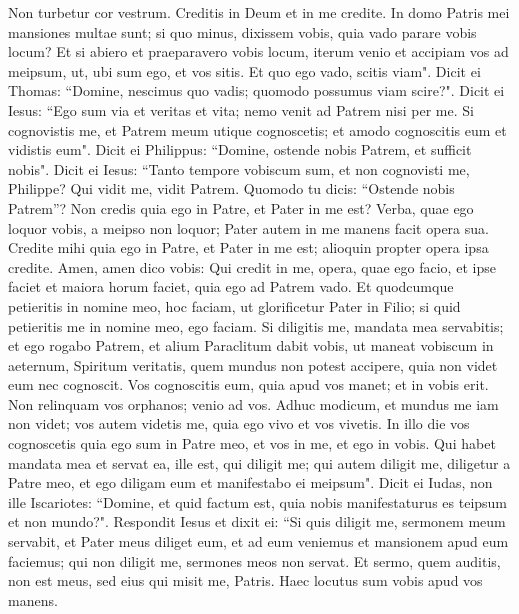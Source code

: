 \begin{biblechapter} 
\verse Non turbetur cor vestrum. Creditis in Deum et in me credite. 
\verse In domo Patris mei mansiones multae sunt; si quo minus, dixissem vobis, quia vado parare vobis locum? 
\verse Et si abiero et praeparavero vobis locum, iterum venio et accipiam vos ad meipsum, ut, ubi sum ego, et vos sitis. 
\verse Et quo ego vado, scitis viam". 
\verse Dicit ei Thomas: “Domine, nescimus quo vadis; quomodo possumus viam scire?".  
\verse Dicit ei Iesus: “Ego sum via et veritas et vita; nemo venit ad Patrem nisi per me. 
\verse Si cognovistis me, et Patrem meum utique cognoscetis; et amodo cognoscitis eum et vidistis eum". 
\verse Dicit ei Philippus: “Domine, ostende nobis Patrem, et sufficit nobis". 
\verse Dicit ei Iesus: “Tanto tempore vobiscum sum, et non cognovisti me, Philippe? Qui vidit me, vidit Patrem. Quomodo tu dicis: “Ostende nobis Patrem”? 
\verse Non credis quia ego in Patre, et Pater in me est? Verba, quae ego loquor vobis, a meipso non loquor; Pater autem in me manens facit opera sua. 
\verse Credite mihi quia ego in Patre, et Pater in me est; alioquin propter opera ipsa credite. 
\verse Amen, amen dico vobis: Qui credit in me, opera, quae ego facio, et ipse faciet et maiora horum faciet, quia ego ad Patrem vado. 
\verse Et quodcumque petieritis in nomine meo, hoc faciam, ut glorificetur Pater in Filio; 
\verse si quid petieritis me in nomine meo, ego faciam. 
\verse Si diligitis me, mandata mea servabitis; 
\verse et ego rogabo Patrem, et alium Paraclitum dabit vobis, ut maneat vobiscum in aeternum, 
\verse Spiritum veritatis, quem mundus non potest accipere, quia non videt eum nec cognoscit. Vos cognoscitis eum, quia apud vos manet; et in vobis erit. 
\verse Non relinquam vos orphanos; venio ad vos. 
\verse Adhuc modicum, et mundus me iam non videt; vos autem videtis me, quia ego vivo et vos vivetis. 
\verse In illo die vos cognoscetis quia ego sum in Patre meo, et vos in me, et ego in vobis. 
\verse Qui habet mandata mea et servat ea, ille est, qui diligit me; qui autem diligit me, diligetur a Patre meo, et ego diligam eum et manifestabo ei meipsum". 
\verse Dicit ei Iudas, non ille Iscariotes: “Domine, et quid factum est, quia nobis manifestaturus es teipsum et non mundo?". 
\verse Respondit Iesus et dixit ei: “Si quis diligit me, sermonem meum servabit, et Pater meus diliget eum, et ad eum veniemus et mansionem apud eum faciemus; 
\verse qui non diligit me, sermones meos non servat. Et sermo, quem auditis, non est meus, sed eius qui misit me, Patris. 
\verse Haec locutus sum vobis apud vos manens. 

\end{biblechapter}
